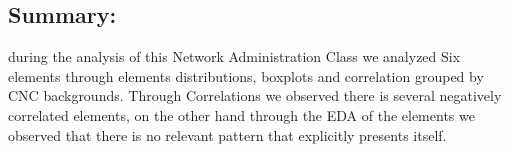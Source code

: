 \documentclass[12pt]{extreport}
\begin{document}
\begin{comment}
\subparagraph{Interpretation of the Box-plots:}
For This Element 


\begin{enumerate}	
	\item The MP Class Box-Plot:
	\begin{enumerate}
		\item MAX = a {} {} {} {} {} {} {} {} UQ = b {} {} {} {} {} {} {} {} Median = c
		\item LQ = d {} {} {} {} {} {} {} {}  MIN =	l {} {} {} {} {} {} {} {}  IQR = e - f = g
	\end{enumerate}
	\item The PSI Class Box-Plot:
	\begin{enumerate}
		\item MAX = a {} {} {} {} {} {} {} {} UQ = b {} {} {} {} {} {} {} {} Median = c
		\item LQ = d {} {} {} {} {} {} {} {}  MIN =	e {} {} {} {} {} {} {} {} IQR = f - g = h	
	\end{enumerate}
	\item The TSI Class Box-Plot:
	\begin{enumerate}
		\item MAX = a {} {} {} {} {} {} {} {} UQ = b {} {} {} {} {} {} {} {} Median = c
		\item LQ = d {} {} {} {} {} {} {} {} MIN = e {} {} {} {} {} {} {} {} IQR = f - g = h	
	\end{enumerate}
\end{enumerate}




\subparagraph{Interpretation of the histogram:}
This Frequency Distribution is (Skeness) with the following descriptive statistics:
\begin{enumerate}
	\item Mean = 
	\item STD = 
	\item Range = a - b = c
	\item IQR = a-b = c 
\end{enumerate}


\end{comment}

\subsection{Summary:}
during the analysis of this Network Administration Class we analyzed Six elements through elements distributions, boxplots and correlation grouped by CNC backgrounds. Through Correlations we observed there is several negatively correlated elements, on the other hand through the EDA of the elements we observed that there is no relevant pattern that explicitly presents itself.
\end{document}
